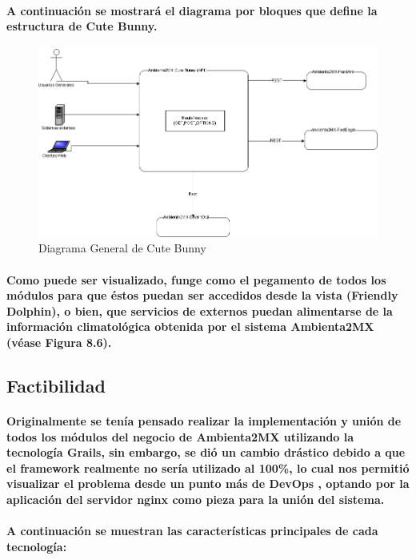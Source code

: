     \paragraph{A continuación se mostrará el diagrama por bloques que define la estructura de Cute Bunny.}
      \begin{figure}[b!]
        \centering
        \includegraphics[width=\textwidth]{./images/DiagramaCuteBunny.png}
        \caption{Diagrama General de Cute Bunny}
      \end{figure}
    \paragraph{Como puede ser visualizado, funge como el pegamento de todos los módulos para que éstos puedan ser accedidos desde la vista (Friendly Dolphin), o bien, que servicios de externos puedan alimentarse de la información climatológica obtenida por el sistema Ambienta2MX (véase Figura 8.6).}    
  \subsection{Factibilidad}      
    \paragraph{Originalmente se tenía pensado realizar la implementación y unión de todos los módulos del negocio de Ambienta2MX utilizando la tecnología Grails, sin embargo, se dió un cambio drástico debido a que el framework realmente no sería utilizado al 100\%, lo cual nos permitió visualizar el problema desde un punto más de DevOps \cite{38}, optando por la aplicación del servidor nginx como pieza para la unión del sistema.}
    \paragraph{A continuación se muestran las características principales de cada tecnología:}
